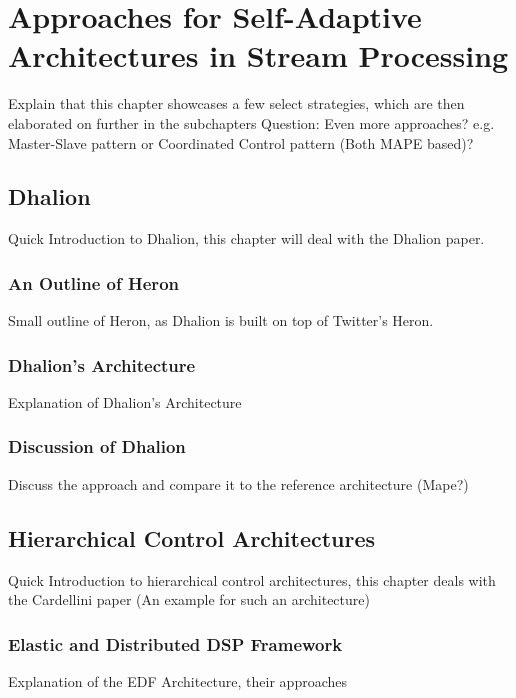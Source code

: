 \chapter{Approaches for Self-Adaptive Architectures in Stream Processing}
Explain that this chapter showcases a few select strategies, which are then elaborated on further in the subchapters
Question: Even more approaches? e.g. Master-Slave pattern or Coordinated Control pattern (Both MAPE based)?

    \section{Dhalion}
    Quick Introduction to Dhalion, this chapter will deal with the Dhalion paper.

        \subsection{An Outline of Heron}
        Small outline of Heron, as Dhalion is built on top of Twitter's Heron.

        \subsection{Dhalion's Architecture}
        Explanation of Dhalion's Architecture 

        \subsection{Discussion of Dhalion}
        Discuss the approach and compare it to the reference architecture (Mape?)

    \section{Hierarchical Control Architectures}
    Quick Introduction to hierarchical control architectures, this chapter deals with the Cardellini
    paper (An example for such an architecture)

        \subsection{Elastic and Distributed DSP Framework}
        Explanation of the EDF Architecture, their approaches

